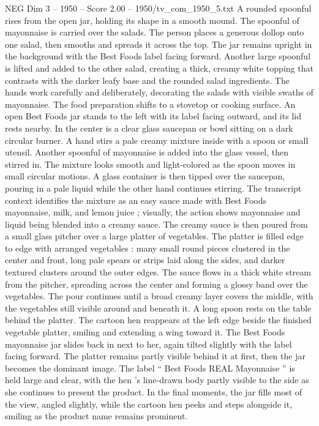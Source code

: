 \begin{textsample}{NEG Dim 3 – 1950 – Score 2.00 – 1950/tv\_com\_1950\_5.txt}
A rounded spoonful rises from the open jar, holding its shape in a smooth mound.
The spoonful of mayonnaise is carried over the salads.
The person places a generous dollop onto one salad, then smooths and spreads it across the top.
The jar remains upright in the background with the Best Foods label facing forward.
Another large spoonful is lifted and added to the other salad, creating a thick, creamy white topping that contrasts with the darker leafy base and the rounded salad ingredients.
The hands work carefully and deliberately, decorating the salads with visible swaths of mayonnaise.
The food preparation shifts to a stovetop or cooking surface.
An open Best Foods jar stands to the left with its label facing outward, and its lid rests nearby.
In the center is a clear glass saucepan or bowl sitting on a dark circular burner.
A hand stirs a pale creamy mixture inside with a spoon or small utensil.
Another spoonful of mayonnaise is added into the glass vessel, then stirred in.
The mixture looks smooth and light-colored as the spoon moves in small circular motions.
A glass container is then tipped over the saucepan, pouring in a pale liquid while the other hand continues stirring.
The transcript context identifies the mixture as an easy sauce made with Best Foods mayonnaise, milk, and lemon juice ; visually, the action shows mayonnaise and liquid being blended into a creamy sauce.
The creamy sauce is then poured from a small glass pitcher over a large platter of vegetables.
The platter is filled edge to edge with arranged vegetables : many small round pieces clustered in the center and front, long pale spears or strips laid along the sides, and darker textured clusters around the outer edges.
The sauce flows in a thick white stream from the pitcher, spreading across the center and forming a glossy band over the vegetables.
The pour continues until a broad creamy layer covers the middle, with the vegetables still visible around and beneath it.
A long spoon rests on the table behind the platter.
The cartoon hen reappears at the left edge beside the finished vegetable platter, smiling and extending a wing toward it.
The Best Foods mayonnaise jar slides back in next to her, again tilted slightly with the label facing forward.
The platter remains partly visible behind it at first, then the jar becomes the dominant image.
The label “ Best Foods REAL Mayonnaise ” is held large and clear, with the hen ’s line-drawn body partly visible to the side as she continues to present the product.
In the final moments, the jar fills most of the view, angled slightly, while the cartoon hen peeks and steps alongside it, smiling as the product name remains prominent.

\end{textsample}
